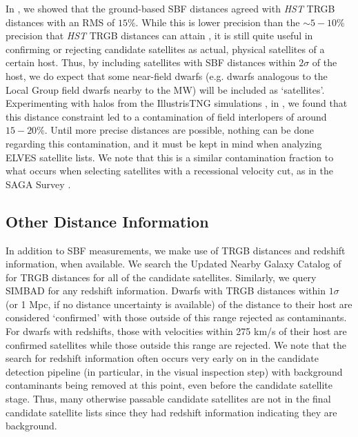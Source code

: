 \documentclass[twocolumn]{aastex62}
\begin{document}
In \citet{sbf_calib}, we showed that the ground-based SBF distances agreed with \emph{HST} TRGB distances with an RMS of $15\%$.  While this is lower precision than the $\sim5-10\%$ precision that \emph{HST} TRGB distances can attain \citep{beaton2018}, it is still quite useful in confirming or rejecting candidate satellites as actual, physical satellites of a certain host. Thus, by including satellites with SBF distances within $2\sigma$ of the host,  we do expect that some near-field dwarfs (e.g. dwarfs analogous to the Local Group field dwarfs nearby to the MW) will be included as `satellites'. Experimenting with halos from the IllustrisTNG simulations \citep{tng1, tng2}, in \citet{carlsten2020b}, we found that this distance constraint led to a contamination of field interlopers of around $15-20\%$. Until more precise distances are possible, nothing can be done regarding this contamination, and it must be kept in mind when analyzing ELVES satellite lists. We note that this is a similar contamination fraction to what occurs when selecting satellites with a recessional velocity cut, as in the SAGA Survey \citep{mao2020}. 





\subsection{Other Distance Information}
In addition to SBF measurements, we make use of TRGB distances and redshift information, when available. We search the Updated Nearby Galaxy Catalog of \cite{karachentsev2004, karachentsev2013} for TRGB distances for all of the candidate satellites. Similarly, we query SIMBAD for any redshift information. Dwarfs with TRGB distances within $1\sigma$ (or 1 Mpc, if no distance uncertainty is available) of the distance to their host are considered `confirmed' with those outside of this range rejected as contaminants. For dwarfs with redshifts, those with velocities within 275 km/s of their host are confirmed satellites \citep[e.g.][]{mao2020} while those outside this range are rejected. We note that the search for redshift information often occurs very early on in the candidate detection pipeline (in particular, in the visual inspection step) with background contaminants being removed at this point, even before the candidate satellite stage. Thus, many otherwise passable candidate satellites are not in the final candidate satellite lists since they had redshift information indicating they are background.  
\end{document}
